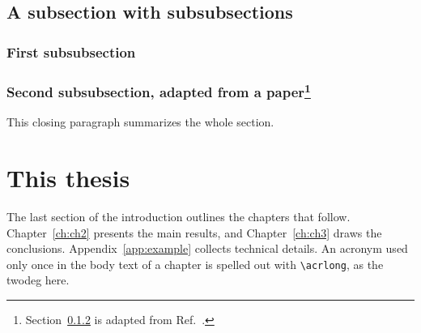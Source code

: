\documentclass[../main]{subfiles}
\begin{document}
\subsection{A subsection with subsubsections}
\label{sec:subsubsections}
\lipsum[12][1-3]

\subsubsection{First subsubsection}
\lipsum[13][1-5]

\subsubsection[Second subsubsection, adapted from a paper]{Second subsubsection, adapted from a paper\footnote{Section~\ref{sec:adapted_subsection} is adapted from Ref.~\cite{Doe:a26}.}}
\label{sec:adapted_subsection}
\lipsum[14][1-5]

\sectionclose
This closing paragraph summarizes the whole section.
\lipsum[15][1-3]

\section{This thesis}
\label{sec:thisthesis}
The last section of the introduction outlines the chapters that follow.
Chapter~\ref{ch:ch2} presents the main results, and Chapter~\ref{ch:ch3} draws the conclusions.
Appendix~\ref{app:example} collects technical details.
An acronym used only once in the body text of a chapter is spelled out with \verb|\acrlong|, as the \acrlong{twodeg} here.
\lipsum[16]

\ifSubfilesClassLoaded{%
\newrefcontext[labelprefix=]
\printbibliography
}{}
\end{document}
